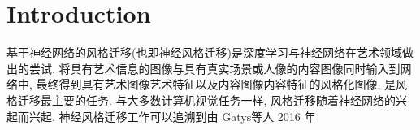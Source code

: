 \section{Introduction}

基于神经网络的风格迁移(也即神经风格迁移)是深度学习与神经网络在艺术领域做出的尝试. 将具有艺术信息的图像与具有真实场景或人像的内容图像同时输入到网络中, 最终得到具有艺术图像艺术特征以及内容图像内容特征的风格化图像, 是风格迁移最主要的任务. 与大多数计算机视觉任务一样, 风格迁移随着神经网络的兴起而兴起. 神经风格迁移工作可以追溯到由 Gatys等人\cite{gatys2016image001} 2016 年